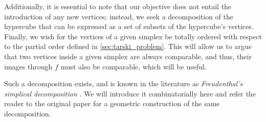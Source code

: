 Additionally, it is essential to note that our objective does not entail the introduction of any new vertices; instead, we seek a decomposition of the hypercube that can be expressed as a set of subsets of the hypercube's vertices. Finally, we wish for the vertices of a given simplex be totally ordered with respect to the partial order defined in \cref{sec:tarski_problem}. This will allow us to argue that two vertices inside a given simplex are always comparable, and thus, their images through $f$ must also be comparable, which will be useful.

Such a decomposition exists, and is known in the literature as \textit{Freudenthal's simplical decomposition} . We will introduce it combinatorially here and refer the reader to the original paper for a geometric construction of the same decomposition.

